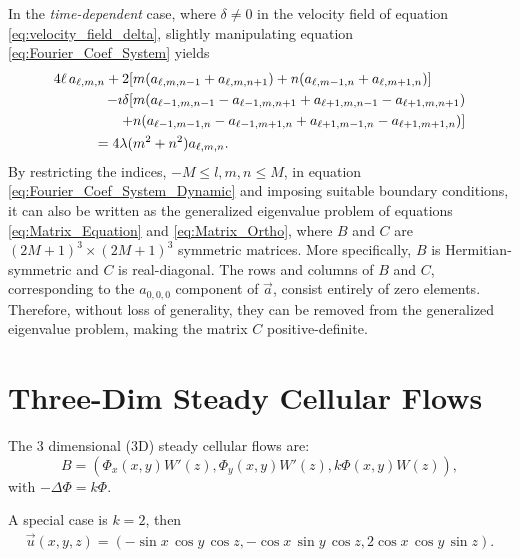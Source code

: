 \documentclass{article}
\newcommand{\be}{\begin{equation}}
\newcommand{\ee}{\end{equation}}
\newcommand{\0}{\mathbf{0}}
\newcommand{\1}{\mathbf{1}}
\newcommand{\2}{\mathbf{2}}
\newcommand{\3}{\mathbf{3}}
\newcommand{\4}{\mathbf{4}}
\newcommand{\5}{\mathbf{5}}
\newcommand{\6}{\mathbf{6}}
\newcommand{\7}{\mathbf{7}}
\newcommand{\8}{\mathbf{8}}
\begin{document}
In the \emph{time-dependent} case, where $\delta\neq0$ in the velocity field
of equation \eqref{eq:velocity_field_delta}, slightly manipulating equation
\eqref{eq:Fourier_Coef_System} yields 
%
\begin{align}\label{eq:Fourier_Coef_System_Dynamic}
4\ell\,a_{\ell,m,n}
+2[&m(a_{\ell,m,n-1}+a_{\ell,m,n+1})+n(a_{\ell,m-1,n}+a_{\ell,m+1,n})]
\notag\\
-\imath\delta[&m(a_{\ell-1,m,n-1}-a_{\ell-1,m,n+1}+a_{\ell+1,m,n-1}-a_{\ell+1,m,n+1})\notag\\
    +&n(a_{\ell-1,m-1,n}-a_{\ell-1,m+1,n}+a_{\ell+1,m-1,n}-a_{\ell+1,m+1,n})] 
\notag\\
=4\lambda(&m^2+n^2)a_{\ell,m,n}.
\end{align}
%
By restricting the indices, $-M\leq l,m,n\leq M$, in equation
\eqref{eq:Fourier_Coef_System_Dynamic} and imposing suitable boundary 
conditions, it can also be
written as the generalized eigenvalue problem of equations
\eqref{eq:Matrix_Equation} and \eqref{eq:Matrix_Ortho}, where  $B$ and
$C$ are $(2M+1)^3\times(2M+1)^3$ symmetric matrices. More specifically,
$B$ is Hermitian-symmetric and $C$ is real-diagonal. The rows and
columns of $B$ and $C$, corresponding to the $a_{0,0,0}$ component of
$\vec{a}$, consist entirely of zero elements. Therefore, without loss
of generality, they can be removed from the generalized eigenvalue
problem, making the matrix $C$ positive-definite.  






\section{Three-Dim Steady Cellular Flows}
The 3 dimensional (3D) steady cellular flows are:
\be
B =
(\Phi_x(x,y)W'(z),\Phi_y(x,y)W'(z),k\Phi(x,y)W(z)), \label{3dcell}
\ee
with $-\Delta \Phi = k \Phi.$   
\medskip

A special case is $k=2$, then
%
\begin{align}\label{3dcell-1}
  \vec{u}(x,y,z) =
  (-\sin{x}\,\cos{y}\,\cos{z},-\cos{x}\,\sin{y}\,\cos{z},2\cos{x}\,\cos{y}\,\sin{z}).  
\end{align}

\medskip


\end{document}
